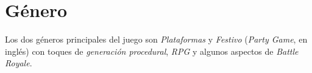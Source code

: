 \section{G\'enero}

Los dos géneros principales del juego son \emph{Plataformas} y \emph{Festivo} (\emph{Party Game}, en inglés) con toques de \emph{generación procedural}, \emph{RPG} y algunos aspectos de
\emph{Battle Royale}.